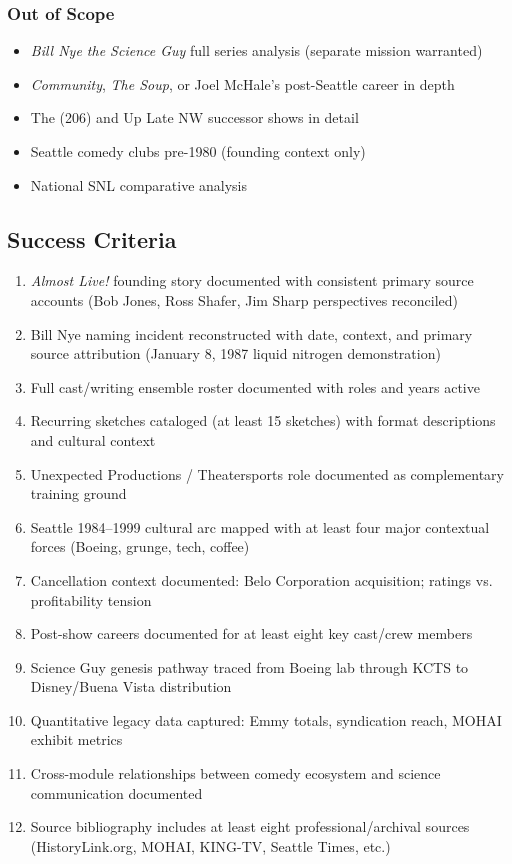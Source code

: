 \documentclass[11pt,letterpaper]{article}
\begin{document}
\subsubsection{Out of Scope}
\begin{itemize}[noitemsep]
  \item \textit{Bill Nye the Science Guy} full series analysis (separate mission warranted)
  \item \textit{Community}, \textit{The Soup}, or Joel McHale's post-Seattle career in depth
  \item The (206) and Up Late NW successor shows in detail
  \item Seattle comedy clubs pre-1980 (founding context only)
  \item National SNL comparative analysis
\end{itemize}

\subsection{Success Criteria}

\begin{enumerate}
  \item \textit{Almost Live!} founding story documented with consistent primary source accounts (Bob Jones, Ross Shafer, Jim Sharp perspectives reconciled)
  \item Bill Nye naming incident reconstructed with date, context, and primary source attribution (January 8, 1987 liquid nitrogen demonstration)
  \item Full cast/writing ensemble roster documented with roles and years active
  \item Recurring sketches cataloged (at least 15 sketches) with format descriptions and cultural context
  \item Unexpected Productions / Theatersports role documented as complementary training ground
  \item Seattle 1984--1999 cultural arc mapped with at least four major contextual forces (Boeing, grunge, tech, coffee)
  \item Cancellation context documented: Belo Corporation acquisition; ratings vs. profitability tension
  \item Post-show careers documented for at least eight key cast/crew members
  \item Science Guy genesis pathway traced from Boeing lab through KCTS to Disney/Buena Vista distribution
  \item Quantitative legacy data captured: Emmy totals, syndication reach, MOHAI exhibit metrics
  \item Cross-module relationships between comedy ecosystem and science communication documented
  \item Source bibliography includes at least eight professional/archival sources (HistoryLink.org, MOHAI, KING-TV, Seattle Times, etc.)
\end{enumerate}
\end{document}
